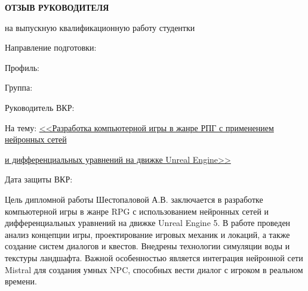 \documentclass[12pt, a4paper, titlepage]{extarticle}
\begin{document}
	\pagestyle{empty}
	
	\drawtitleruler

	\vspace*{-30pt}
	
	
	\vspace*{-10pt}

	\begin{center}

		\textbf{ОТЗЫВ РУКОВОДИТЕЛЯ}

		\vspace*{-4pt}
		на выпускную квалификационную работу студентки

		\vspace{5pt}


	\end{center}

	\noindent Направление подготовки: \underline{}

	\noindent Профиль: \underline{}

	\noindent Группа: \underline{}

	\noindent Руководитель ВКР: 

	\noindent На тему: \underline{\hspace{10pt} <<Разработка компьютерной игры в жанре РПГ с применением нейронных сетей}

	\noindent \underline{и дифференциальных уравнений на движке Unreal Engine>> \hspace{50pt}}

	\begin{flushright}
		Дата защиты ВКР:  
		\hphantom{\hspace{40pt}}
	\end{flushright}

	Цель дипломной работы Шестопаловой А.В. заключается в разработке компьютерной игры в жанре RPG с использованием нейронных сетей и дифференциальных уравнений на движке Unreal Engine 5. В работе проведен анализ концепции игры, проектирование игровых механик и локаций, а также создание систем диалогов и квестов. Внедрены технологии симуляции воды и текстуры ландшафта. Важной особенностью является интеграция нейронной сети Mistral для создания умных NPC, способных вести диалог с игроком в реальном времени.
\end{document}
